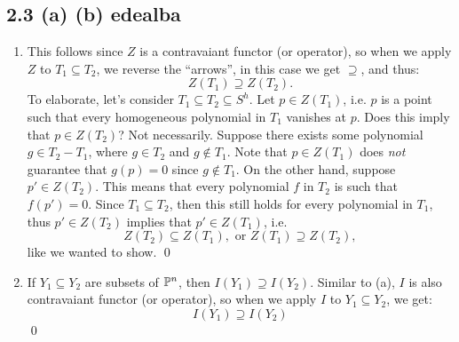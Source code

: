 \subsection*{2.3 (a) (b) {edealba}}

\begin{enumerate}
    \item This follows since $Z$ is a contravaiant functor (or operator), so when we apply $Z$ to $T_1 \subseteq T_2$, we reverse the ``arrows'', in this case we get $\supseteq$, and thus:
$$ Z(T_1) \supseteq Z(T_2). $$
To elaborate, let's consider $T_1 \subseteq T_2 \subseteq S^h$. Let $p \in Z(T_1)$, i.e. $p$ is a point such that every homogeneous polynomial in $T_1$ vanishes at $p$. Does this imply that $p \in Z(T_2)$? Not necessarily. Suppose there exists some polynomial $g \in T_2 - T_1$, where $g \in T_2$ and $g \notin T_1$. Note that $p \in Z(T_1)$ does \emph{not} guarantee that $g(p) = 0$ since $g \notin T_1$. On the other hand, suppose $p' \in Z(T_2)$. This means that every polynomial $f$ in $T_2$ is such that $f(p') = 0$. Since $T_1 \subseteq T_2$, then this still holds for every polynomial in $T_1$, thus $p' \in Z(T_2)$ implies that $p' \in Z(T_1)$, i.e.
$$ Z(T_2) \subseteq Z(T_1), \text{ or } Z(T_1) \supseteq Z(T_2), $$
like we wanted to show. \qed
    \item  If $Y_1 \subseteq Y_2$ are subsets of $\P^n$, then $I(Y_1) \supseteq I(Y_2)$.
Similar to (a), $I$ is also contravaiant functor (or operator), so when we apply $I$ to $Y_1 \subseteq Y_2$, we get:
$$ I(Y_1) \supseteq I(Y_2) $$ \qed
\end{enumerate}